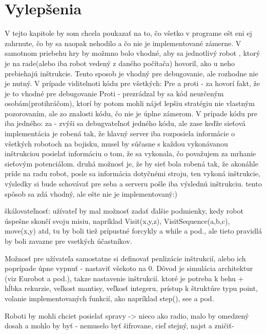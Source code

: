 \chapter{Vylepšenia}
V tejto kapitole by som chcela poukazať na to, čo všetko v programe ešt eni ej zahrnute, čo by sa naopak nehodilo a čo nie je implementované zámerne.
V samotnom priebehu hry by možmno bolo vhodné, aby sa jednotlivý robot , ktorý je na rade(alebo iba robot vedený z daného počítača) hovoril, ako u neho prebiehajú inštrukcie. Tento sposob je vhodný pre debugovanie, ale rozhodne nie je nutný.
V prípade viditelnoti kódu pre všetkých:
Pre a proti - za hovorí fakt, že je to vhodné pre debugovanie
Proti - prezrádzal by sa kód neurčeným osobám(protihráčom), ktorí by potom mohli nájsť lepšiu stratégiu nie vlastným pozorovaním, ale zo znalosti kódu, čo nie je úplne zámerom.
V prípade kódu pre iba jedného:
za - zvýši sa debugvateľnoť jedného kódu, ale zase keďže sieťová implementácia je robená tak, že hlavný server iba rozposiela informácie o všetkých robotoch na bojisku, musel by súčasne s každou vykonávanou inštrukciou posielať informáciu o tom, že sa vykonala, čo považujem za mrhanie sieťovým potenciálom. druhá možnosť je, že by sieť bola robená tak, že akonáhle príde na radu robot, posle sa informácia dotyčnémi stroju, ten vykoná inštrukcie, výsledky si bude schovávať pre seba a serveru pošle iba výslednú inštrukciu. tento spôsob sa zdá vhodný, ale ešte nie je implementovaný:)

škálovateľnosť:
užívateľ by mal možnosť zadať ďalšie podmienky, kedy robot úspešne skončí svoju misiu, napríklad Visit(x,y,z), VisitSequence(a,b,c), move(x,y) atd, tu by boli tiež prípustné forcykly  a while a pod., ale tieto pravidlá by boli zavazne pre vsetkých účastníkov.

Možnosť pre užívateľa samostatne si definovať penlizácie inštrukcií, alebo ich poprípade úpne vypnuť - nastaviť všekoto na 0. Dôvod je simulácia architektur (viz Eurobot a pod.), takze nastavenie inštrukcií. ktoré je potreba k behu + hĺbka rekurzie, veľkost mantisy, veľkosť integeru, prístup k štruktúre typu point, volanie implementovaných funkcií, ako napríklad step(), see a pod.

Roboti by mohli chciet posielať spravy -> nieco ako radio, malo by omedzený dosah a mohlo by byť - nemuselo byť šifrovane, cieľ stejný, najst a zničiť-
